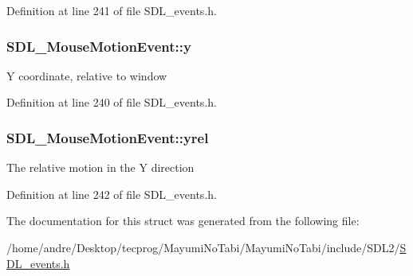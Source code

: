 Definition at line 241 of file S\-D\-L\-\_\-events.\-h.

\hypertarget{struct_s_d_l___mouse_motion_event_a7e6a7b1f8713d1968dc913908e8ea448}{
\subsubsection[{y}]{ S\-D\-L\-\_\-\-Mouse\-Motion\-Event\-::y}}\label{struct_s_d_l___mouse_motion_event_a7e6a7b1f8713d1968dc913908e8ea448}
Y coordinate, relative to window 

Definition at line 240 of file S\-D\-L\-\_\-events.\-h.

\hypertarget{struct_s_d_l___mouse_motion_event_a7674c8b92d039ab948f671a180fa7b30}{
\subsubsection[{yrel}]{ S\-D\-L\-\_\-\-Mouse\-Motion\-Event\-::yrel}}\label{struct_s_d_l___mouse_motion_event_a7674c8b92d039ab948f671a180fa7b30}
The relative motion in the Y direction 

Definition at line 242 of file S\-D\-L\-\_\-events.\-h.



The documentation for this struct was generated from the following file\-:\begin{DoxyCompactItemize}
\item 
/home/andre/\-Desktop/tecprog/\-Mayumi\-No\-Tabi/\-Mayumi\-No\-Tabi/include/\-S\-D\-L2/\hyperlink{_s_d_l__events_8h}{S\-D\-L\-\_\-events.\-h}\end{DoxyCompactItemize}
